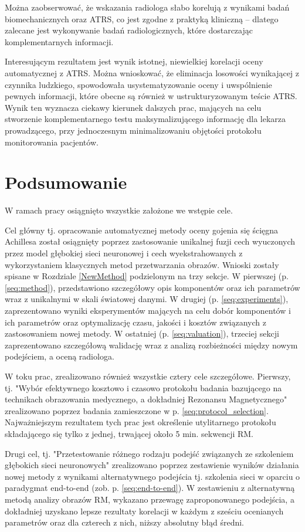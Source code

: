 Można zaobserwować, że wskazania radiologa słabo korelują z wynikami badań biomechanicznych oraz ATRS, co jest zgodne z praktyką kliniczną -- dlatego zalecane jest wykonywanie badań radiologicznych, które dostarczając komplementarnych informacji.

Interesującym rezultatem jest wynik istotnej, niewielkiej korelacji oceny automatycznej z ATRS. Można wnioskować, że eliminacja losowości wynikającej z czynnika ludzkiego, spowodowała usystematyzowanie oceny i uwspólnienie pewnych informacji, które obecne są również w ustrukturyzowanym teście ATRS. Wynik ten wyznacza ciekawy kierunek dalszych prac, mających na celu stworzenie komplementarnego testu maksymalizującego informację dla lekarza prowadzącego, przy jednoczesnym minimalizowaniu objętości protokołu monitorowania pacjentów.

\chapter{Podsumowanie}

W ramach pracy osiągnięto wszystkie założone we wstępie cele. 

Cel główny tj. opracowanie automatycznej metody oceny gojenia się ścięgna Achillesa został osiągnięty poprzez zastosowanie unikalnej fuzji cech wyuczonych przez model głębokiej sieci neuronowej i cech wyekstrahowanych z wykorzystaniem klasycznych metod przetwarzania obrazów. Wnioski zostały spisane w Rozdziale \ref{NewMethod} podzielonym na trzy sekcje. W pierwszej (p. \ref{seq:method}), przedstawiono szczegółowy opis komponentów oraz ich parametrów wraz z unikalnymi w skali światowej danymi. W drugiej (p. \ref{seq:experiments}), zaprezentowano wyniki eksperymentów mających na celu dobór komponentów i ich parametrów oraz optymalizację czasu, jakości i kosztów związanych z zastosowaniem nowej metody. W ostatniej (p. \ref{seq:valuation}), trzeciej sekcji zaprezentowano szczegółową walidację wraz z analizą rozbieżności między nowym podejściem, a oceną radiologa.

W toku prac, zrealizowano również wszystkie cztery cele szczegółowe. Pierwszy, tj. "Wybór efektywnego kosztowo i czasowo protokołu badania bazującego na technikach obrazowania medycznego, a dokładniej Rezonansu Magnetycznego" zrealizowano poprzez badania zamieszczone w p. \ref{seq:protocol_selection}. Najważniejszym rezultatem tych prac jest określenie utylitarnego protokołu składającego się tylko z jednej, trwającej około 5 min. sekwencji RM. 

Drugi cel, tj. "Przetestowanie różnego rodzaju podejść związanych ze szkoleniem głębokich sieci neuronowych" zrealizowano poprzez zestawienie wyników działania nowej metody z wynikami alternatywnego podejścia tj. szkolenia sieci w oparciu o paradygmat end-to-end (zob. p. \ref{seq:end-to-end}). W zestawieniu z alternatywną metodą analizy obrazów RM, wykazano przewagę zaproponowanego podejścia, a dokładniej uzyskano lepsze rezultaty korelacji w każdym z sześciu ocenianych parametrów oraz dla czterech z nich, niższy absolutny błąd średni.

